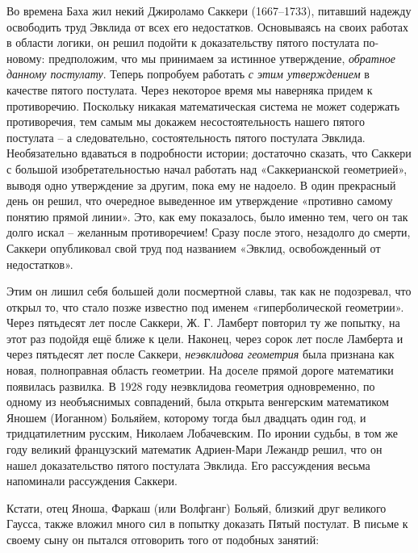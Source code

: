 \documentclass[../main.tex]{subfiles}
\begin{document}
Во времена Баха жил некий Джироламо Саккери (1667--1733), питавший надежду освободить труд Эвклида от всех его недостатков. Основываясь на своих работах в области логики, он решил подойти к доказательству пятого постулата по-новому: предположим, что мы принимаем за истинное утверждение, \emph{обратное данному постулату}. Теперь попробуем работать \emph{с этим утверждением} в качестве пятого постулата. Через некоторое время мы наверняка придем к противоречию. Поскольку никакая математическая система не может содержать противоречия, тем самым мы докажем несостоятельность нашего пятого постулата \--- а следовательно, состоятельность пятого постулата Эвклида. Необязательно вдаваться в подробности истории; достаточно сказать, что Саккери с большой изобретательностью начал работать над «Саккерианской геометрией», выводя одно утверждение за другим, пока ему не надоело. В один прекрасный день он решил, что очередное выведенное им утверждение «противно самому понятию прямой линии». Это, как ему показалось, было именно тем, чего он так долго искал \--- желанным противоречием! Сразу после этого, незадолго до смерти, Саккери опубликовал свой труд под названием «Эвклид, освобожденный от недостатков».

Этим он лишил себя большей доли посмертной славы, так как не подозревал, что открыл то, что стало позже известно под именем «гиперболической геометрии». Через пятьдесят лет после Саккери, Ж. Г. Ламберт повторил ту же попытку, на этот раз подойдя ещё ближе к цели. Наконец, через сорок лет после Ламберта и через пятьдесят лет после Саккери, \emph{неэвклидова геометрия} была признана как новая, полноправная область геометрии. На доселе прямой дороге математики появилась развилка. В 1928 году неэвклидова геометрия одновременно, по одному из необъяснимых совпадений, была открыта венгерским математиком Яношем (Иоганном) Больяйем, которому тогда был двадцать один год, и тридцатилетним русским, Николаем Лобачевским. По иронии судьбы, в том же году великий французский математик Адриен-Мари Лежандр решил, что он нашел доказательство пятого постулата Эвклида. Его рассуждения весьма напоминали рассуждения Саккери.

Кстати, отец Яноша, Фаркаш (или Волфганг) Больяй, близкий друг великого Гаусса, также вложил много сил в попытку доказать Пятый постулат. В письме к своему сыну он пытался отговорить того от подобных занятий:
\end{document}
